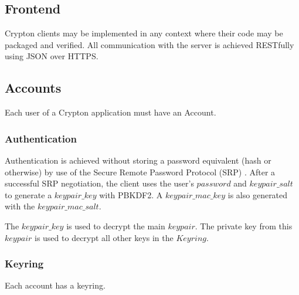 \documentclass[conference]{IEEEtran}
\begin{document}
\subsection{Frontend}
Crypton clients may be implemented in any context where their code may be
packaged and verified. All communication with the server is achieved
RESTfully using JSON over HTTPS.

\subsection{Accounts}
Each user of a Crypton application must have an Account.

\subsubsection{Authentication}
Authentication is achieved without storing a password equivalent
(hash or otherwise) by use of the Secure Remote Password Protocol (SRP)
\cite{srp-protocol}. After a successful SRP negotiation, the client uses
the user's \(password\) and \(keypair\_salt\) to generate a \(keypair\_key\)
with PBKDF2\cite{pbkdf2}. A \(keypair\_mac\_key\) is also generated with
the \(keypair\_mac\_salt\).

The \(keypair\_key\) is used to decrypt the main \(keypair\). The private key
from this \(keypair\) is used to decrypt all other keys in the \(Keyring\).

\subsubsection{Keyring}
Each account has a keyring.
\end{document}
